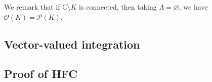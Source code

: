 \documentclass[]{article}
\theoremstyle{definition}
\begin{document}
We remark that if \(\mathbb{C} \setminus K\) is connected, then taking \(\Lambda = \varnothing\), we 
have \(\mathcal{O}(K) = \mathcal{P}(K)\).

\subsection{Vector-valued integration}



\subsection{Proof of HFC}
\end{document}
